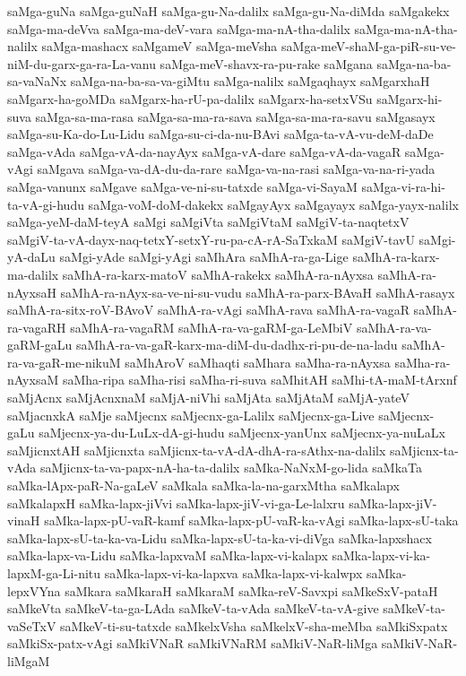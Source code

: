 {saMga-guNa
saMga-guNaH
saMga-gu-Na-dalilx
saMga-gu-Na-diMda
saMgakekx
saMga-ma-deVva
saMga-ma-deV-vara
saMga-ma-nA-tha-dalilx
saMga-ma-nA-tha-nalilx
saMga-mashacx
saMgameV
saMga-meVsha
saMga-meV-shaM-ga-piR-su-ve-niM-du-garx-ga-ra-La-vanu
saMga-meV-shavx-ra-pu-rake
saMgana
saMga-na-ba-sa-vaNaNx
saMga-na-ba-sa-va-giMtu
saMga-nalilx
saMgaqhayx
saMgarxhaH
saMgarx-ha-goMDa
saMgarx-ha-rU-pa-dalilx
saMgarx-ha-setxVSu
saMgarx-hi-suva
saMga-sa-ma-rasa
saMga-sa-ma-ra-sava
saMga-sa-ma-ra-savu
saMgasayx
saMga-su-Ka-do-Lu-Lidu
saMga-su-ci-da-nu-BAvi
saMga-ta-vA-vu-deM-daDe
saMga-vAda
saMga-vA-da-nayAyx
saMga-vA-dare
saMga-vA-da-vagaR
saMga-vAgi
saMgava
saMga-va-dA-du-da-rare
saMga-va-na-rasi
saMga-va-na-ri-yada
saMga-vanunx
saMgave
saMga-ve-ni-su-tatxde
saMga-vi-SayaM
saMga-vi-ra-hi-ta-vA-gi-hudu
saMga-voM-doM-dakekx
saMgayAyx
saMgayayx
saMga-yayx-nalilx
saMga-yeM-daM-teyA
saMgi
saMgiVta
saMgiVtaM
saMgiV-ta-naqtetxV
saMgiV-ta-vA-dayx-naq-tetxY-setxY-ru-pa-cA-rA-SaTxkaM
saMgiV-tavU
saMgi-yA-daLu
saMgi-yAde
saMgi-yAgi
saMhAra
saMhA-ra-ga-Lige
saMhA-ra-karx-ma-dalilx
saMhA-ra-karx-matoV
saMhA-rakekx
saMhA-ra-nAyxsa
saMhA-ra-nAyxsaH
saMhA-ra-nAyx-sa-ve-ni-su-vudu
saMhA-ra-parx-BAvaH
saMhA-rasayx
saMhA-ra-sitx-roV-BAvoV
saMhA-ra-vAgi
saMhA-rava
saMhA-ra-vagaR
saMhA-ra-vagaRH
saMhA-ra-vagaRM
saMhA-ra-va-gaRM-ga-LeMbiV
saMhA-ra-va-gaRM-gaLu
saMhA-ra-va-gaR-karx-ma-diM-du-dadhx-ri-pu-de-na-ladu
saMhA-ra-va-gaR-me-nikuM
saMhAroV
saMhaqti
saMhara
saMha-ra-nAyxsa
saMha-ra-nAyxsaM
saMha-ripa
saMha-risi
saMha-ri-suva
saMhitAH
saMhi-tA-maM-tArxnf
saMjAcnx
saMjAcnxnaM
saMjA-niVhi
saMjAta
saMjAtaM
saMjA-yateV
saMjacnxkA
saMje
saMjecnx
saMjecnx-ga-Lalilx
saMjecnx-ga-Live
saMjecnx-gaLu
saMjecnx-ya-du-LuLx-dA-gi-hudu
saMjecnx-yanUnx
saMjecnx-ya-nuLaLx
saMjicnxtAH
saMjicnxta
saMjicnx-ta-vA-dA-dhA-ra-sAthx-na-dalilx
saMjicnx-ta-vAda
saMjicnx-ta-va-papx-nA-ha-ta-dalilx
saMka-NaNxM-go-lida
saMkaTa
saMka-lApx-paR-Na-gaLeV
saMkala
saMka-la-na-garxMtha
saMkalapx
saMkalapxH
saMka-lapx-jiVvi
saMka-lapx-jiV-vi-ga-Le-lalxru
saMka-lapx-jiV-vinaH
saMka-lapx-pU-vaR-kamf
saMka-lapx-pU-vaR-ka-vAgi
saMka-lapx-sU-taka
saMka-lapx-sU-ta-ka-va-Lidu
saMka-lapx-sU-ta-ka-vi-diVga
saMka-lapxshacx
saMka-lapx-va-Lidu
saMka-lapxvaM
saMka-lapx-vi-kalapx
saMka-lapx-vi-ka-lapxM-ga-Li-nitu
saMka-lapx-vi-ka-lapxva
saMka-lapx-vi-kalwpx
saMka-lepxVYna
saMkara
saMkaraH
saMkaraM
saMka-reV-Savxpi
saMkeSxV-pataH
saMkeVta
saMkeV-ta-ga-LAda
saMkeV-ta-vAda
saMkeV-ta-vA-give
saMkeV-ta-vaSeTxV
saMkeV-ti-su-tatxde
saMkelxVsha
saMkelxV-sha-meMba
saMkiSxpatx
saMkiSx-patx-vAgi
saMkiVNaR
saMkiVNaRM
saMkiV-NaR-liMga
saMkiV-NaR-liMgaM
}

